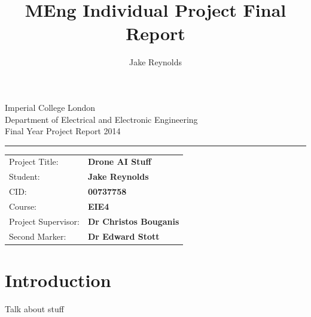 \documentclass{article}
\begin{document}
\begin{titlepage}
                \setlength{\parindent}{0pt}
                \setlength{\parskip}{0pt}

                {
                                \Large
                                \raggedright
                                Imperial College London\\[17pt]
                                Department of Electrical and Electronic Engineering\\[17pt]
                                Final Year Project Report 2014\\[17pt]
 
                }

                \rule{\columnwidth}{3pt}
                \vfill
                \centering
                
                \vfill
                \setlength{\tabcolsep}{0pt}

                \begin{tabular}{p{40mm}p{\dimexpr\columnwidth-40mm}}
                                Project Title: & \textbf{Drone AI Stuff} \\[12pt]
                                Student: & \textbf{Jake Reynolds} \\[12pt]
                                CID: & \textbf{00737758} \\[12pt]
                                Course: & \textbf{EIE4} \\[12pt]
                                Project Supervisor: & \textbf{Dr Christos Bouganis} \\[12pt]
                                Second Marker: & \textbf{Dr Edward Stott} \\
                \end{tabular}
\end{titlepage}

\title{MEng Individual Project Final Report}
\author{Jake Reynolds}

\maketitle

\tableofcontents


\section{Introduction}
Talk about stuff
\end{document}
